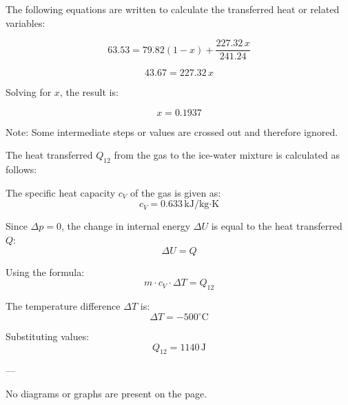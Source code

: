 The following equations are written to calculate the transferred heat or related variables:

\[
63.53 = 79.82 \left(1 - x\right) + \frac{227.32 \, x}{241.24}
\]

\[
43.67 = 227.32 \, x
\]

Solving for \( x \), the result is:

\[
x = 0.1937
\]  

Note: Some intermediate steps or values are crossed out and therefore ignored.

The heat transferred \( Q_{12} \) from the gas to the ice-water mixture is calculated as follows:  

The specific heat capacity \( c_V \) of the gas is given as:  
\[
c_V = 0.633 \, \text{kJ/kg·K}
\]  

Since \( \Delta p = 0 \), the change in internal energy \( \Delta U \) is equal to the heat transferred \( Q \):  
\[
\Delta U = Q
\]  

Using the formula:  
\[
m \cdot c_V \cdot \Delta T = Q_{12}
\]  

The temperature difference \( \Delta T \) is:  
\[
\Delta T = -500^\circ\text{C}
\]  

Substituting values:  
\[
Q_{12} = 1140 \, \text{J}
\]  

--- 

No diagrams or graphs are present on the page.